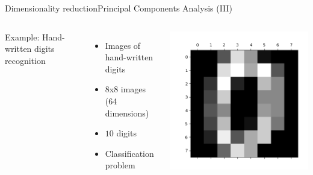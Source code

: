\documentclass[10pt,compress]{beamer} %
\begin{document}
\begin{frame}{Dimensionality reduction}{Principal Components Analysis (III)}
	\vspace{-0.5cm}
    \begin{columns}
		Example: Hand-written digits recognition
		\begin{itemize}
			\item Images of hand-written digits
			\item 8x8 images (64 dimensions)
			\item $10$ digits
			\item Classification problem
		\end{itemize}
			\includegraphics[width=\linewidth]{figs/zero.png}
    \end{columns}


\end{frame}
\end{document}
